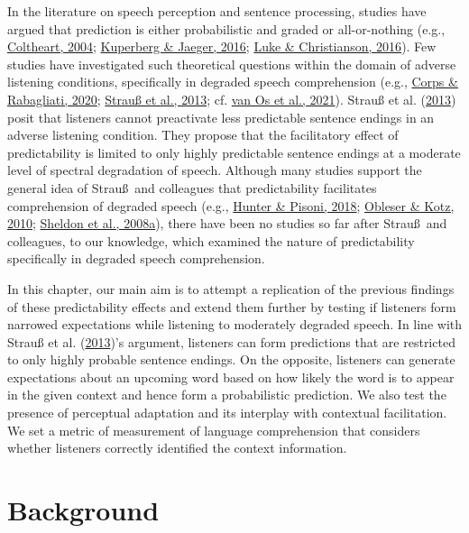 \documentclass[a4paper, nobind]{templates/ociamthesis}
\begin{document}
In the literature on speech perception and sentence processing, studies have argued that prediction is either probabilistic and graded or all-or-nothing (e.g., \protect\hyperlink{ref-Coltheart2004}{Coltheart, 2004}; \protect\hyperlink{ref-Kuperberg2016}{Kuperberg \& Jaeger, 2016}; \protect\hyperlink{ref-Luke2016}{Luke \& Christianson, 2016}).
Few studies have investigated such theoretical questions within the domain of adverse listening conditions, specifically in degraded speech comprehension (e.g., \protect\hyperlink{ref-Corps2020}{Corps \& Rabagliati, 2020}; \protect\hyperlink{ref-Strauss2013}{Strauß et al., 2013}; cf. \protect\hyperlink{ref-vanOs2021}{van Os et al., 2021}).
Strauß et al. (\protect\hyperlink{ref-Strauss2013}{2013}) posit that listeners cannot preactivate less predictable sentence endings in an adverse listening condition.
They propose that the facilitatory effect of predictability is limited to only highly predictable sentence endings at a moderate level of spectral degradation of speech.
Although many studies support the general idea of Strau\ss~and colleagues that predictability facilitates comprehension of degraded speech (e.g., \protect\hyperlink{ref-Hunter2018}{Hunter \& Pisoni, 2018}; \protect\hyperlink{ref-Obleser2010}{Obleser \& Kotz, 2010}; \protect\hyperlink{ref-Sheldon2008a}{Sheldon et al., 2008a}),
there have been no studies so far after Strau\ss~and colleagues, to our knowledge, which examined the nature of predictability specifically in degraded speech comprehension.

In this chapter, our main aim is to attempt a replication of the previous findings of these predictability effects
and extend them further by testing if listeners form narrowed expectations while listening to moderately degraded speech.
In line with Strauß et al. (\protect\hyperlink{ref-Strauss2013}{2013})'s argument, listeners can form predictions that are restricted to only highly probable sentence endings.
On the opposite, listeners can generate expectations about an upcoming word based on how likely the word is to appear in the given context
and hence form a probabilistic prediction.
We also test the presence of perceptual adaptation and its interplay with contextual facilitation.
We set a metric of measurement of language comprehension that considers whether listeners correctly identified the context information.

\hypertarget{background-1}{%
\section{Background}\label{background-1}}
\end{document}
